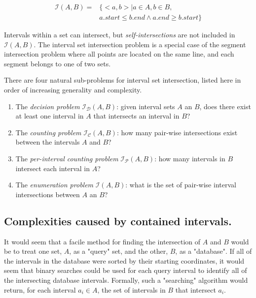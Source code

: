 \documentclass{bioinfo}
\begin{document}
	\begin{equation*}
		\begin{split}
			\mathcal{I}(A,B)= &\{ <a,b> | a \in A, b \in B, \\
			& a.start \leq b.end \wedge a.end \geq b.start\}
		\end{split}
	\end{equation*}

	Intervals within a set can intersect, but {\em self-intersections} are not
	included in $\mathcal{I}(A,B)$.  The interval set intersection problem is a
	special case of the segment intersection problem where all points are located on
	the same line, and each segment belongs to one of two sets.

	There are four natural sub-problems for interval set intersection, listed here
	in order of increasing generality and complexity.
	\begin{enumerate}
		\item The {\em decision problem} $\mathcal{I_D}(A,B)$:  given interval sets $A$
		an $B$, does there exist at least one interval in $A$ that intersects an interval in
		$B$?
		\item The {\em counting problem} $\mathcal{I_C}(A,B)$: how many pair-wise
		intersections exist between the intervals $A$ and $B$?
		\item The {\em per-interval counting problem} $\mathcal{I_P}(A,B)$: how many
		intervals in $B$ intersect each interval in $A$?
		\item The {\em enumeration problem} $\mathcal{I}(A,B)$: what is the set of
		pair-wise interval intersections between $A$ an $B$?
	\end{enumerate}

	\subsection{Complexities caused by contained intervals.}
	
	It would seem that a facile method for finding the intersection of
	$A$ and $B$ would be to treat one set, $A$, as a "query" set, and the
	other, $B$, as a "database". If all of the intervals in the 
	database were sorted by their starting coordinates, it would seem that binary
	searches could be used for each query interval to identify all of the intersecting
	database intervals. Formally, such a "searching" algorithm would return,
	for each interval $a_i \in A$, the set of intervals in $B$ that intersect $a_i$.
\end{document}
